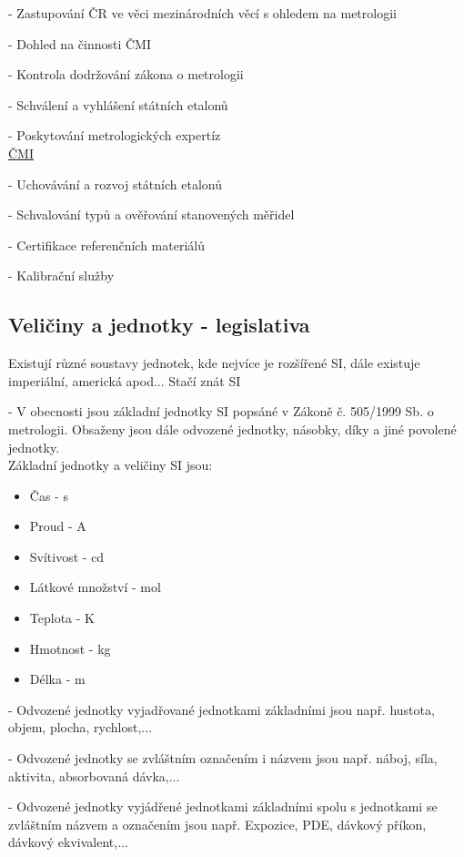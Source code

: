 - Zastupování ČR ve věci mezinárodních věcí s ohledem na metrologii

- Dohled na činnosti ČMI

- Kontrola dodržování zákona o metrologii

- Schválení a vyhlášení státních etalonů

- Poskytování metrologických expertíz
\\

\underline{ČMI}

- Uchovávání a rozvoj státních etalonů

- Schvalování typů a ověřování stanovených měřidel

- Certifikace referenčních materiálů

- Kalibrační služby
\\

\subsection{Veličiny a jednotky - legislativa}

Existují různé soustavy jednotek, kde nejvíce je rozšířené SI, dále existuje imperiální, americká apod... Stačí znát SI

- V obecnosti jsou základní jednotky SI popsáné v Zákoně č. 505/1999 Sb. o metrologii. Obsaženy jsou dále odvozené jednotky, násobky, díky a jiné povolené jednotky.
\\

Základní jednotky a veličiny SI jsou:
\begin{itemize}
    \item Čas - s
    \item Proud - A
    \item Svítivost - cd
    \item Látkové množství - mol
    \item Teplota - K
    \item Hmotnost - kg
    \item Délka - m
\end{itemize}

- Odvozené jednotky vyjadřované jednotkami základními jsou např. hustota, objem, plocha, rychlost,...

- Odvozené jednotky se zvláštním označením i názvem jsou např. náboj, síla, aktivita, absorbovaná dávka,...

- Odvozené jednotky vyjádřené jednotkami základními spolu s jednotkami se zvláštním názvem a označením jsou např. Expozice, PDE, dávkový příkon, dávkový ekvivalent,...
\\

